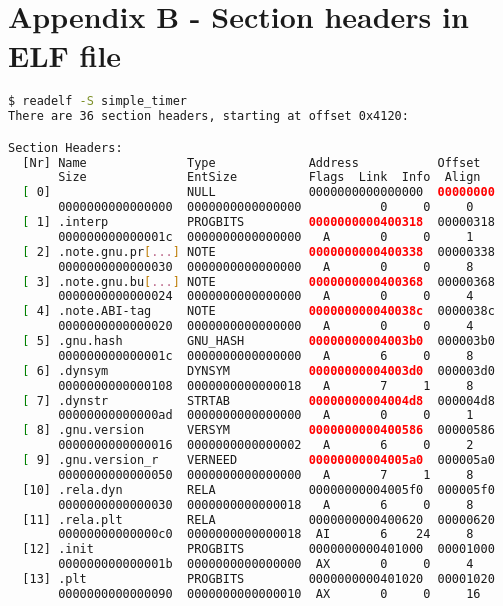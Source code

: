\chapter* {Appendix B - Section headers in ELF file} \label{annex:readelf_commands}
\begin{lstlisting}[language=bash, caption={List of ELF section headers with readelf tool of a program compiled with GCC.}, label={code:elf_sections}]
$ readelf -S simple_timer
There are 36 section headers, starting at offset 0x4120:

Section Headers:
  [Nr] Name              Type             Address           Offset
       Size              EntSize          Flags  Link  Info  Align
  [ 0]                   NULL             0000000000000000  00000000
       0000000000000000  0000000000000000           0     0     0
  [ 1] .interp           PROGBITS         0000000000400318  00000318
       000000000000001c  0000000000000000   A       0     0     1
  [ 2] .note.gnu.pr[...] NOTE             0000000000400338  00000338
       0000000000000030  0000000000000000   A       0     0     8
  [ 3] .note.gnu.bu[...] NOTE             0000000000400368  00000368
       0000000000000024  0000000000000000   A       0     0     4
  [ 4] .note.ABI-tag     NOTE             000000000040038c  0000038c
       0000000000000020  0000000000000000   A       0     0     4
  [ 5] .gnu.hash         GNU_HASH         00000000004003b0  000003b0
       000000000000001c  0000000000000000   A       6     0     8
  [ 6] .dynsym           DYNSYM           00000000004003d0  000003d0
       0000000000000108  0000000000000018   A       7     1     8
  [ 7] .dynstr           STRTAB           00000000004004d8  000004d8
       00000000000000ad  0000000000000000   A       0     0     1
  [ 8] .gnu.version      VERSYM           0000000000400586  00000586
       0000000000000016  0000000000000002   A       6     0     2
  [ 9] .gnu.version_r    VERNEED          00000000004005a0  000005a0
       0000000000000050  0000000000000000   A       7     1     8
  [10] .rela.dyn         RELA             00000000004005f0  000005f0
       0000000000000030  0000000000000018   A       6     0     8
  [11] .rela.plt         RELA             0000000000400620  00000620
       00000000000000c0  0000000000000018  AI       6    24     8
  [12] .init             PROGBITS         0000000000401000  00001000
       000000000000001b  0000000000000000  AX       0     0     4
  [13] .plt              PROGBITS         0000000000401020  00001020
       0000000000000090  0000000000000010  AX       0     0     16

\end{lstlisting}
